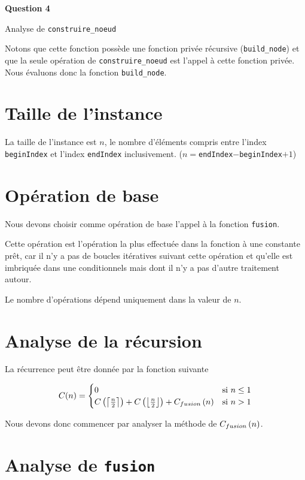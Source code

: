 \documentclass[class=article]{standalone}
\begin{document}
 
\centerline{\Huge \bf Question 4}

\centerline{Analyse de \lstinline{construire_noeud}}

Notons que cette fonction possède une fonction privée récursive (\lstinline{build_node}) 
et que la seule opération de \lstinline{construire_noeud}
est l'appel à cette fonction privée. Nous évaluons donc la fonction \lstinline{build_node}.

\section*{Taille de l'instance}

La taille de l'instance est $n$, le nombre d'éléments compris entre
l'index \lstinline{beginIndex} et l'index \lstinline{endIndex} 
inclusivement. ($n = $\lstinline{endIndex}$-$\lstinline{beginIndex}$+1$)

\section*{Opération de base}

Nous devons choisir comme opération de base l'appel à la fonction \lstinline{fusion}.

Cette opération est l'opération la plus effectuée dans la fonction à une constante prêt, car il n'y a pas de boucles 
itératives suivant cette opération et qu'elle est imbriquée dans une conditionnels mais dont il n'y a pas d'autre traitement autour.

Le nombre d'opérations dépend uniquement dans la valeur de $n$.

\section*{Analyse de la récursion}

La récurrence peut être donnée par la fonction suivante

\[
  C(n) =
  \begin{cases}
    0 & \text{si } n \leq 1 \\
    C\left ( \left \lceil \frac{n}{2} \right \rceil \right ) + C\left ( \left \lfloor \frac{n}{2} \right \rfloor \right ) + C_{fusion}\left ( n \right )  & \text{si } n > 1 \\
  \end{cases}
\]

Nous devons donc commencer par analyser la méthode de $C_{fusion}\left ( n \right )$.

\section*{Analyse de \lstinline{fusion}}
\end{document}
